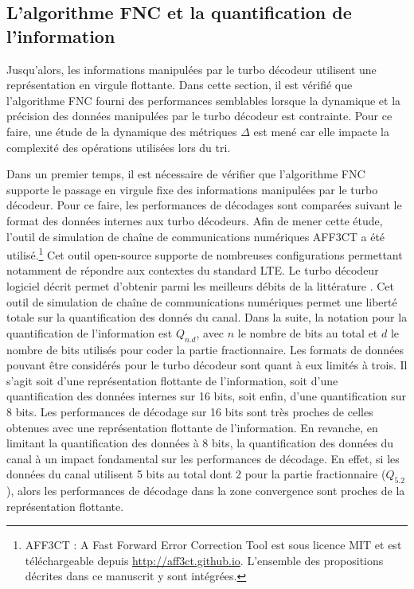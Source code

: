 \subsection{L'algorithme FNC et la quantification de l'information}
Jusqu'alors, les informations manipulées par le turbo décodeur utilisent une représentation en virgule flottante. Dans cette section, 
il est vérifié que l'algorithme FNC fourni des performances semblables lorsque la dynamique et la précision des données manipulées par
le turbo décodeur est contrainte. Pour ce faire, une étude de la dynamique des métriques $\Delta$ est mené car elle impacte
la complexité des opérations utilisées lors du tri.

Dans un premier temps, il est nécessaire de vérifier que l'algorithme FNC supporte le passage en virgule fixe des informations
manipulées par le turbo décodeur. Pour ce 
faire, les performances de décodages sont comparées suivant le format des données internes aux turbo décodeurs. 
Afin de mener cette étude, l'outil de simulation de chaîne de communications numériques AFF3CT a été utilisé.\footnote{AFF3CT : A Fast Forward Error Correction Tool est sous licence MIT et est téléchargeable depuis \url{http://aff3ct.github.io}. L'ensemble des propositions décrites dans ce manuscrit y sont intégrées.} Cet outil 
open-source supporte de nombreuses configurations permettant notamment de répondre aux contextes du standard LTE. Le 
turbo décodeur logiciel décrit permet d'obtenir parmi les meilleurs débits de la littérature . 
Cet outil de simulation de chaîne de communications numériques permet une liberté totale sur la quantification des 
donnés du canal. Dans la suite, la notation pour la quantification de l'information est $Q_{n.d}$, avec $n$ le nombre de bits au total
et $d$ le nombre de bits utilisés pour coder la partie fractionnaire. Les formats de données pouvant être considérés pour 
le turbo décodeur sont quant à eux limités à trois. Il s'agit soit d'une représentation flottante de l'information, 
soit d'une quantification des données internes sur 16 bits, soit enfin, d'une quantification sur 8 bits.
Les performances de décodage sur 16 bits sont très proches de celles obtenues avec une 
représentation flottante de l'information. En revanche, en limitant la quantification des données 
à 8 bits, la quantification des données du canal à un impact fondamental sur les performances de décodage.
En effet, si les données du canal utilisent 5 bits au total dont 2 pour la partie fractionnaire 
($Q_{5.2}$), alors les performances de décodage dans la zone convergence sont proches de la représentation flottante. 
